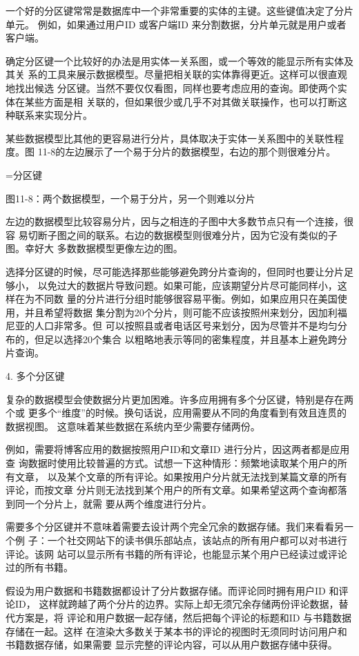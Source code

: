 一个好的分区键常常是数据库中一个非常重要的实体的主键。这些键值决定了分片单元。
例如，如果通过用户ID 或客户端ID 来分割数据，分片单元就是用户或者客户端。

确定分区键一个比较好的办法是用实体一关系图，或一个等效的能显示所有实体及其关
系的工具来展示数据模型。尽量把相关联的实体靠得更近。这样可以很直观地找出候选
分区键。当然不要仅仅看图，同样也要考虑应用的查询。即使两个实体在某些方面是相
关联的，但如果很少或几乎不对其做关联操作，也可以打断这种联系来实现分片。

某些数据模型比其他的更容易进行分片，具体取决于实体一关系图中的关联性程度。图
11-8的左边展示了一个易于分片的数据模型，右边的那个则很难分片。

=分区键

图11-8：两个数据模型，一个易于分片，另一个则难以分片

左边的数据模型比较容易分片，因与之相连的子图中大多数节点只有一个连接，很容
易切断子图之间的联系。右边的数据模型则很难分片，因为它没有类似的子图。幸好大
多数数据模型更像左边的图。

选择分区键的时候，尽可能选择那些能够避免跨分片查询的，但同时也要让分片足够小，
以免过大的数据片导致问题。如果可能，应该期望分片尽可能同样小，这样在为不同数
量的分片进行分组时能够很容易平衡。例如，如果应用只在美国使用，并且希望将数据
集分割为20个分片，则可能不应该按照州来划分，因加利福尼亚的人口非常多。但
可以按照县或者电话区号来划分，因为尽管并不是均匀分布的，但足以选择20个集合
以粗略地表示等同的密集程度，并且基本上避免跨分片查询。

4. 多个分区键

复杂的数据模型会使数据分片更加困难。许多应用拥有多个分区键，特别是存在两个或
更多个“维度”的时候。换句话说，应用需要从不同的角度看到有效且连贯的数据视图。
这意味着某些数据在系统内至少需要存储两份。

例如，需要将博客应用的数据按照用户ID和文章ID 进行分片，因这两者都是应用查
询数据时使用比较普遍的方式。试想一下这种情形：频繁地读取某个用户的所有文章，
以及某个文章的所有评论。如果按用户分片就无法找到某篇文章的所有评论，而按文章
分片则无法找到某个用户的所有文章。如果希望这两个查询都落到同一个分片上，就需
要从两个维度进行分片。

需要多个分区键并不意味着需要去设计两个完全冗余的数据存储。我们来看看另一个例
子：一个社交网站下的读书俱乐部站点，该站点的所有用户都可以对书进行评论。该网
站可以显示所有书籍的所有评论，也能显示某个用户已经读过或评论过的所有书籍。

假设为用户数据和书籍数据都设计了分片数据存储。而评论同时拥有用户ID 和评论ID，
这样就跨越了两个分片的边界。实际上却无须冗余存储两份评论数据，替代方案是，将
评论和用户数据一起存储，然后把每个评论的标题和ID 与书籍数据存储在一起。这样
在渲染大多数关于某本书的评论的视图时无须同时访问用户和书籍数据存储，如果需要
显示完整的评论内容，可以从用户数据存储中获得。

